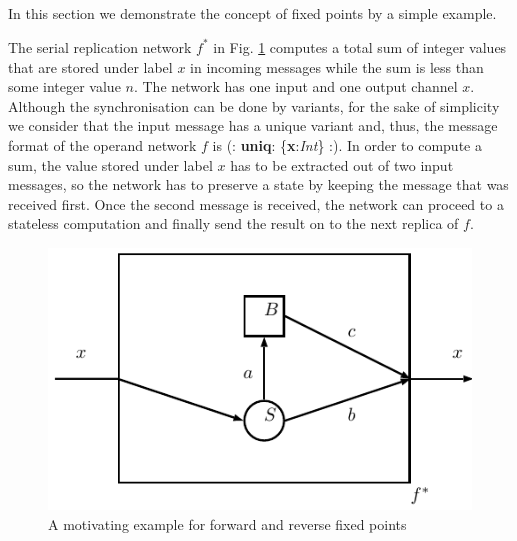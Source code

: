     \subsection*{}
In this section we demonstrate the concept of fixed points by a simple example.

The serial replication network $f^{*}$ in Fig. \ref{fig:fp_examp} computes a total sum of integer values that are stored under label $x$ in incoming messages while the sum is less than some integer value $n$. The network has one input and one output channel $x$. Although the synchronisation can be done by variants, for the sake of simplicity we consider that the input message has a unique variant and, thus, the message format of the operand network $f$ is (: \textbf{uniq}: \{\textbf{x}:\emph{Int}\} :). In order to compute a sum, the value stored under label $x$ has to be extracted out of two input messages, so the network has to preserve a state by keeping the message that was received first. Once the second message is received, the network can proceed to a stateless computation and finally send the result on to the next replica of $f$.

\begin{figure}[h!]
\centering
\includegraphics[scale=0.8]{figs/chapter_04_fp_example.pdf}
\caption{A motivating example for forward and reverse fixed points}
\label{fig:fp_examp}
\end{figure}

